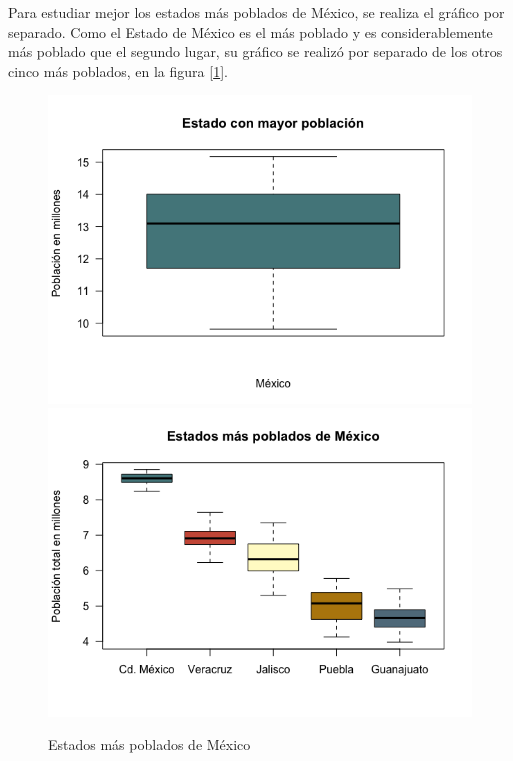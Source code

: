 \documentclass[12pt,letterpaper]{article}
\begin{document}
Para estudiar mejor los estados más poblados de México, se realiza el gráfico por separado. Como el Estado de México es el más poblado y es considerablemente más poblado que el segundo lugar, su gráfico se realizó por separado de los otros cinco más poblados, en la figura [\ref{maspoblados}].
\begin{figure}[h!]
\centering
\includegraphics[scale=0.42]{mexico.png}
\includegraphics[scale=0.42]{mas-poblados.png}
\caption{Estados más poblados de México}
\label{maspoblados}
\end{figure}
\end{document}
